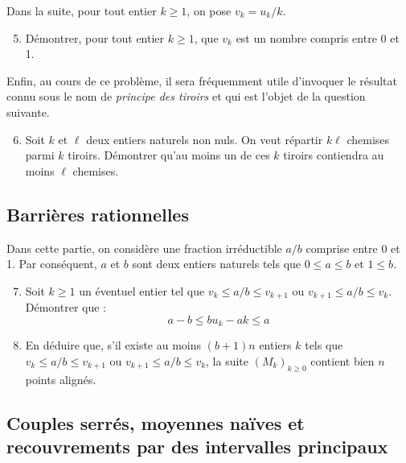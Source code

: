 \documentclass[landscape,twocolumn,leqno,a4paper,10pt]{report} %
\newcommand\n{\noindent}
\renewcommand{\geq}{\geqslant}
\renewcommand{\leq}{\leqslant}
\begin{document}
\n Dans la suite, pour tout entier $k \geq 1$, on pose $v_{k}=u_{k} / k$.

\begin{enumerate}\setcounter{enumi}{4}
	\item Démontrer, pour tout entier $k \geq 1$, que $v_{k}$ est un nombre compris entre 0 et 1.
\end{enumerate}

\n Enfin, au cours de ce problème, il sera fréquemment utile d'invoquer le résultat connu sous le nom de \textit{principe des tiroirs} et qui est l'objet de la question suivante.

\begin{enumerate}\setcounter{enumi}{5}
	\item Soit $k$ et $\ell$ deux entiers naturels non nuls. On veut répartir $k \ell$ chemises parmi $k$ tiroirs. Démontrer qu'au moins un de ces $k$ tiroirs contiendra au moins $\ell$ chemises.
\end{enumerate}


\subsection{Barrières rationnelles}

\n Dans cette partie, on considère une fraction irréductible $a / b$ comprise entre 0 et 1. Par conséquent, $a$ et $b$ sont deux entiers naturels tels que $0 \leq a \leq b$ et $1 \leq b$.
\begin{enumerate}\setcounter{enumi}{6}
	\item Soit $k \geq 1$ un éventuel entier tel que $v_{k} \leq a / b \leq v_{k+1}$ ou $v_{k+1} \leq a / b \leq v_{k}$. Démontrer que :
	$$a-b \leq b u_{k}-a k \leq a $$
	\item  En déduire que, s'il existe au moins $(b+1) n$ entiers $k$ tels que $v_{k} \leq a / b \leq v_{k+1}$ ou $v_{k+1} \leq a / b \leq v_{k}$, la suite $\left(M_{k}\right)_{k \geq 0}$ contient bien $n$ points alignés.
\end{enumerate}


\subsection{Couples serrés, moyennes naïves et recouvrements par des intervalles principaux}
\end{document}
